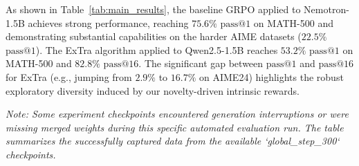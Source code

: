 As shown in Table~\ref{tab:main_results}, the baseline GRPO applied to Nemotron-1.5B achieves strong performance, reaching $75.6\%$ $\text{pass}@1$ on MATH-500 and demonstrating substantial capabilities on the harder AIME datasets ($22.5\%$ $\text{pass}@1$). The ExTra algorithm applied to Qwen2.5-1.5B reaches $53.2\%$ $\text{pass}@1$ on MATH-500 and $82.8\%$ $\text{pass}@16$. The significant gap between $\text{pass}@1$ and $\text{pass}@16$ for ExTra (e.g., jumping from $2.9\%$ to $16.7\%$ on AIME24) highlights the robust exploratory diversity induced by our novelty-driven intrinsic rewards. 

\textit{Note: Some experiment checkpoints encountered generation interruptions or were missing merged weights during this specific automated evaluation run. The table summarizes the successfully captured data from the available `global\_step\_300` checkpoints.}